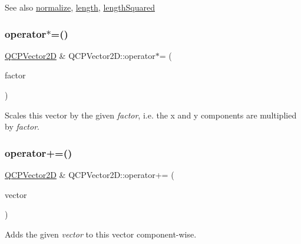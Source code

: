 \begin{DoxySeeAlso}{See also}
\hyperlink{class_q_c_p_vector2_d_ad83268be370685c2a0630acc0fb1a425}{normalize}, \hyperlink{class_q_c_p_vector2_d_a10adb5ab031fe94f0b64a3c5aefb552e}{length}, \hyperlink{class_q_c_p_vector2_d_a766585459d84cb149334fda1a498b2e5}{length\+Squared} 
\end{DoxySeeAlso}
\mbox{\label{class_q_c_p_vector2_d_aa52a246d168f475a4231c7bdfdac7df1}} 
\subsubsection{\texorpdfstring{operator$\ast$=()}{operator*=()}}
{\footnotesize\ttfamily \hyperlink{class_q_c_p_vector2_d}{Q\+C\+P\+Vector2D} \& Q\+C\+P\+Vector2\+D\+::operator$\ast$= (\begin{DoxyParamCaption}\item[{double}]{factor }\end{DoxyParamCaption})}

Scales this vector by the given {\itshape factor}, i.\+e. the x and y components are multiplied by {\itshape factor}. \mbox{\label{class_q_c_p_vector2_d_aa2c34754ce8839b2d074dec741783c5e}} 
\subsubsection{\texorpdfstring{operator+=()}{operator+=()}}
{\footnotesize\ttfamily \hyperlink{class_q_c_p_vector2_d}{Q\+C\+P\+Vector2D} \& Q\+C\+P\+Vector2\+D\+::operator+= (\begin{DoxyParamCaption}\item[{const \hyperlink{class_q_c_p_vector2_d}{Q\+C\+P\+Vector2D} \&}]{vector }\end{DoxyParamCaption})}

Adds the given {\itshape vector} to this vector component-\/wise. \mbox{\label{class_q_c_p_vector2_d_a3a2e906bb924983bb801e89f28a3d566}} 
